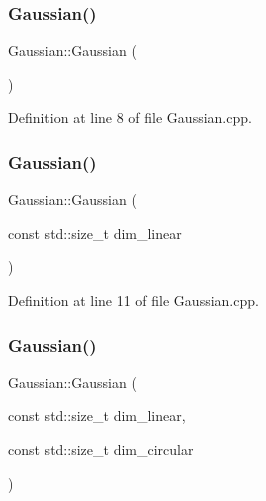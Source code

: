 \subsubsection{\texorpdfstring{Gaussian()}{Gaussian()}\hspace{0.1cm}{\footnotesize\ttfamily [1/3]}}
{\footnotesize\ttfamily Gaussian\+::\+Gaussian (\begin{DoxyParamCaption}{ }\end{DoxyParamCaption})}



Definition at line 8 of file Gaussian.\+cpp.

\mbox{\label{classbfl_1_1Gaussian_aa096285a5065804c2f0838135de47875}} 
\subsubsection{\texorpdfstring{Gaussian()}{Gaussian()}\hspace{0.1cm}{\footnotesize\ttfamily [2/3]}}
{\footnotesize\ttfamily Gaussian\+::\+Gaussian (\begin{DoxyParamCaption}\item[{const std\+::size\+\_\+t}]{dim\+\_\+linear }\end{DoxyParamCaption})}



Definition at line 11 of file Gaussian.\+cpp.

\mbox{\label{classbfl_1_1Gaussian_a99507926f6b8df85b6a512c21afe2b50}} 
\subsubsection{\texorpdfstring{Gaussian()}{Gaussian()}\hspace{0.1cm}{\footnotesize\ttfamily [3/3]}}
{\footnotesize\ttfamily Gaussian\+::\+Gaussian (\begin{DoxyParamCaption}\item[{const std\+::size\+\_\+t}]{dim\+\_\+linear,  }\item[{const std\+::size\+\_\+t}]{dim\+\_\+circular }\end{DoxyParamCaption})}



